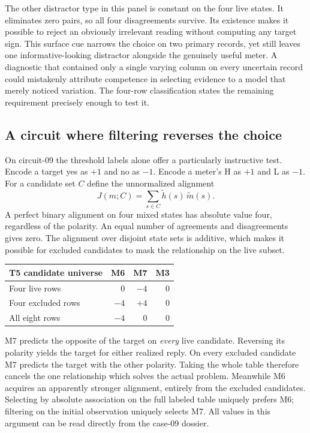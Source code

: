 \documentclass[12pt,letterpaper]{article}
\begin{document}
The other distractor type in this panel is constant on the four live states. It eliminates zero pairs, so all four disagreements survive. Its existence makes it possible to reject an obviously irrelevant reading without computing any target sign. This surface cue narrows the choice on two primary records, yet still leaves one informative-looking distractor alongside the genuinely useful meter. A diagnostic that contained only a single varying column on every uncertain record could mistakenly attribute competence in selecting evidence to a model that merely noticed variation. The four-row classification states the remaining requirement precisely enough to test it.

\subsection{A circuit where filtering reverses the choice}

On circuit-09 the threshold labels alone offer a particularly instructive test. Encode a target yes as $+1$ and no as $-1$. Encode a meter's H as $+1$ and L as $-1$. For a candidate set $C$ define the unnormalized alignment
\[
                   J(m;C)=\sum_{s\in C} \widetilde h(s)\,\widetilde m(s).
\]
A perfect binary alignment on four mixed states has absolute value four, regardless of the polarity. An equal number of agreements and disagreements gives zero. The alignment over disjoint state sets is additive, which makes it possible for excluded candidates to mask the relationship on the live subset.

\begin{center}\small
\begin{tabularx}{.85\linewidth}{@{}Yrrr@{}}\toprule
T5 candidate universe & M6 & M7 & M3 \\ \midrule
Four live rows & 0 & $-4$ & 0\\
Four excluded rows & $-4$ & $+4$ & 0\\
All eight rows & $-4$ & 0 & 0\\ \bottomrule
\end{tabularx}\end{center}

M7 predicts the opposite of the target on \emph{every} live candidate. Reversing its polarity yields the target for either realized reply. On every excluded candidate M7 predicts the target with the other polarity. Taking the whole table therefore cancels the one relationship which solves the actual problem. Meanwhile M6 acquires an apparently stronger alignment, entirely from the excluded candidates. Selecting by absolute association on the full labeled table uniquely prefers M6; filtering on the initial observation uniquely selects M7. All values in this argument can be read directly from the case-09 dossier.
\end{document}
